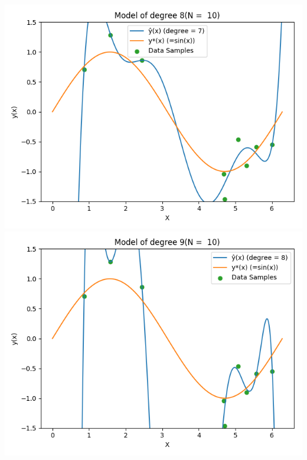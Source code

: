 \documentclass{article}
\begin{document}
\includegraphics[width=\linewidth]{8.png}
\includegraphics[width=\linewidth]{9.png}
\end{document}
